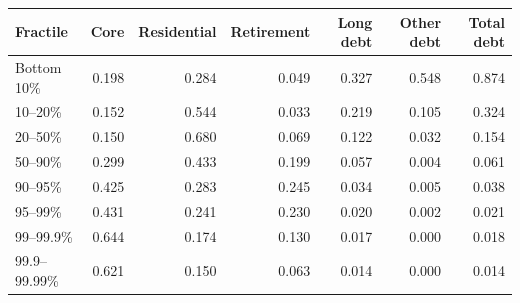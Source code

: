 \begin{tabular*}{\linewidth}{@{\extracolsep{\fill}}lrrrrrr}\toprule
Fractile & Core & Residential & Retirement & Long debt & Other debt & Total debt \\
\midrule
Bottom 10\% & 0.198 & 0.284 & 0.049 & 0.327 & 0.548 & 0.874 \\
10--20\% & 0.152 & 0.544 & 0.033 & 0.219 & 0.105 & 0.324 \\
20--50\% & 0.150 & 0.680 & 0.069 & 0.122 & 0.032 & 0.154 \\
50--90\% & 0.299 & 0.433 & 0.199 & 0.057 & 0.004 & 0.061 \\
90--95\% & 0.425 & 0.283 & 0.245 & 0.034 & 0.005 & 0.038 \\
95--99\% & 0.431 & 0.241 & 0.230 & 0.020 & 0.002 & 0.021 \\
99--99.9\% & 0.644 & 0.174 & 0.130 & 0.017 & 0.000 & 0.018 \\
99.9--99.99\% & 0.621 & 0.150 & 0.063 & 0.014 & 0.000 & 0.014 \\
\bottomrule
\end{tabular*}
